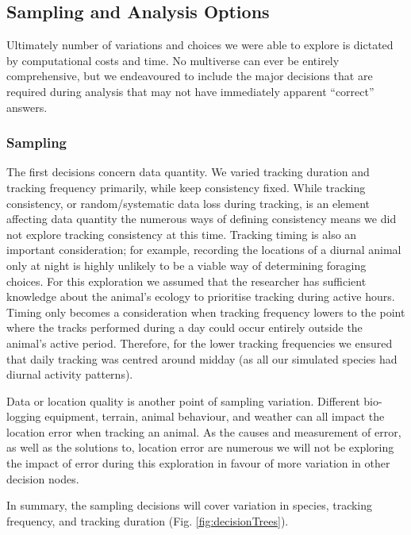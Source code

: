 \documentclass[10pt,a4paper]{article}
\begin{document}
\hypertarget{sampling-and-analysis-options}{%
\subsection{Sampling and Analysis Options}\label{sampling-and-analysis-options}}

Ultimately number of variations and choices we were able to explore is dictated by computational costs and time.
No multiverse can ever be entirely comprehensive, but we endeavoured to include the major decisions that are required during analysis that may not have immediately apparent ``correct'' answers.

\hypertarget{sampling}{%
\subsubsection{Sampling}\label{sampling}}

The first decisions concern data quantity.
We varied tracking duration and tracking frequency primarily, while keep consistency fixed.
While tracking consistency, or random/systematic data loss during tracking, is an element affecting data quantity the numerous ways of defining consistency means we did not explore tracking consistency at this time.
Tracking timing is also an important consideration; for example, recording the locations of a diurnal animal only at night is highly unlikely to be a viable way of determining foraging choices.
For this exploration we assumed that the researcher has sufficient knowledge about the animal's ecology to prioritise tracking during active hours.
Timing only becomes a consideration when tracking frequency lowers to the point where the tracks performed during a day could occur entirely outside the animal's active period.
Therefore, for the lower tracking frequencies we ensured that daily tracking was centred around midday (as all our simulated species had diurnal activity patterns).

Data or location quality is another point of sampling variation.
Different bio-logging equipment, terrain, animal behaviour, and weather can all impact the location error when tracking an animal.
As the causes and measurement of error, as well as the solutions to, location error are numerous we will not be exploring the impact of error during this exploration in favour of more variation in other decision nodes.

In summary, the sampling decisions will cover variation in species, tracking frequency, and tracking duration (Fig. \ref{fig:decisionTrees}).
\end{document}
